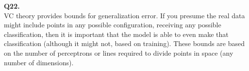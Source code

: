 \documentclass[]{article}
\begin{document}
	\noindent
	\textbf{Q22.}\\
	VC theory provides bounds for generalization error. If you presume the real data might include points in any possible configuration, receiving any possible classification, then it is important that the model is able to even make that classification (although it might not, based on training). These bounds are based on the number of perceptrons or lines required to divide points in space (any number of dimensions). 
\end{document}
